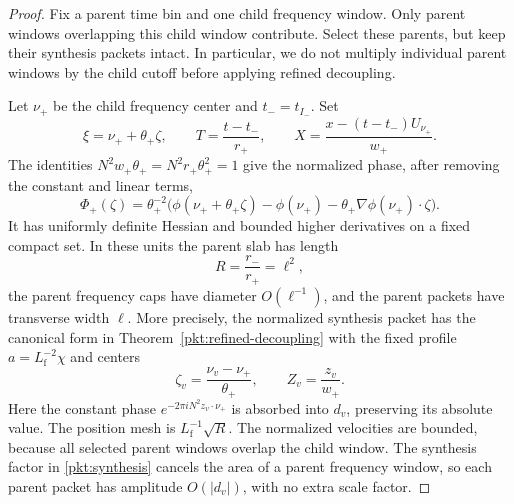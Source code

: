 \begin{proof}
Fix a parent time bin and one child frequency window.  Only parent
windows overlapping this child window contribute.  Select these
parents, but keep their synthesis packets intact.  In particular, we
do not multiply individual parent windows by the child cutoff before
applying refined decoupling.

Let $\nu_+$ be the child frequency center and $t_-=t_{I_-}$.
Set
\[
 \xi=\nu_++\theta_+\zeta,\qquad
 T=\frac{t-t_-}{r_+},\qquad
 X=\frac{x-(t-t_-)U_{\nu_+}}{w_+}.
\]
The identities $N^2w_+\theta_+=N^2r_+\theta_+^2=1$ give the
normalized phase, after removing the constant and linear terms,
\[
 \Phi_+(\zeta)=\theta_+^{-2}
 \bigl(\phi(\nu_++\theta_+\zeta)-\phi(\nu_+)
                 -\theta_+\nabla\phi(\nu_+)\cdot\zeta\bigr).
\]
It has uniformly definite Hessian and bounded higher derivatives on
a fixed compact set.  In these units the parent slab has length
\[
 R=\frac{r_-}{r_+}=\ell^2,
\]
the parent frequency caps have diameter $O(\ell^{-1})$, and the parent
packets have transverse width $\ell$. More precisely, the
normalized synthesis packet has the canonical form in
Theorem~\ref{pkt:refined-decoupling} with the fixed profile
$a=L_{\mathrm f}^{-2}\chi$ and centers
\[
 \zeta_v=\frac{\nu_v-\nu_+}{\theta_+},\qquad
 Z_v=\frac{z_v}{w_+}.
\]
Here the constant phase $e^{-2\pi iN^2z_v\cdot\nu_+}$ is absorbed
into $d_v$, preserving its absolute value.  The position mesh is
$L_{\mathrm f}^{-1}\sqrt R$. The normalized velocities are
bounded, because all selected parent windows overlap the child window.
The synthesis factor in \eqref{pkt:synthesis} cancels the area of a
parent frequency window, so each parent packet has amplitude
$O(|d_v|)$, with no extra scale factor.


\end{proof}
